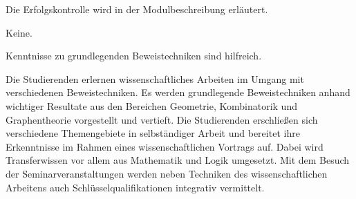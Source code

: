 \begin{course}

\setdoclanguagegerman
{}



\coursehead


\label{cour_8499.dp_997}


\begin{styleenv}
\begin{assessment}
Die Erfolgskontrolle wird in der Modulbeschreibung erläutert.


\end{assessment}

\begin{conditions}Keine.\end{conditions}

\begin{recommendations}Kenntnisse zu grundlegenden Beweistechniken sind hilfreich.

\end{recommendations}
\end{styleenv}

\begin{learningoutcomes}
Die Studierenden erlernen wissenschaftliches Arbeiten im Umgang mit verschiedenen Beweistechniken. Es werden grundlegende Beweistechniken anhand wichtiger Resultate aus den Bereichen Geometrie, Kombinatorik und Graphentheorie vorgestellt und vertieft. Die Studierenden erschließen sich verschiedene Themengebiete in selbständiger Arbeit und bereitet ihre Erkenntnisse im Rahmen eines wissenschaftlichen Vortrags auf. Dabei wird Transferwissen vor allem aus Mathematik und Logik umgesetzt. Mit dem Besuch der Seminarveranstaltungen werden neben Techniken des wissenschaftlichen Arbeitens auch Schlüsselqualifikationen integrativ vermittelt.


\end{learningoutcomes}


\end{course}
